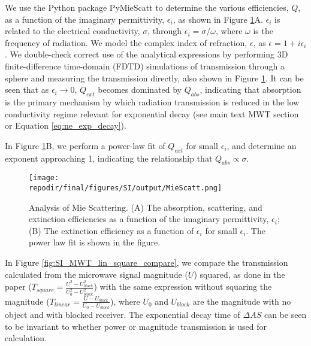 
We use the Python package PyMieScatt to determine the various efficiencies, $Q$, as a function of the imaginary permittivity, $\epsilon_i$, as shown in Figure \ref{fig:SI_Mie_Scattering}A. $\epsilon_i$ is related to the electrical conductivity, $\sigma$, through $\epsilon_i = \sigma/\omega$, where $\omega$ is the frequency of radiation. \cite{coltonComplexWaveNumber2021}  We model the complex index of refraction, $\epsilon$, as $\epsilon = 1 + i\epsilon_i$. We double-check correct use of the analytical expressions by performing 3D finite-difference time-domain (FDTD) simulations of transmission through a sphere and measuring the transmission directly, also shown in Figure \ref{fig:SI_Mie_Scattering}. It can be seen that as $\epsilon_i \rightarrow 0$, $Q_{ext}$ becomes dominated by $Q_{abs}$, indicating that absorption is the primary mechanism by which radiation transmission is reduced in the low conductivity regime relevant for exponential decay (see main text MWT section or Equation \ref{eq:ne_exp_decay}).

In Figure \ref{fig:SI_Mie_Scattering}B, we perform a power-law fit of $Q_{ext}$ for small $\epsilon_i$, and determine an exponent approaching 1, indicating the relationship that $Q_{abs} \propto \sigma$. 


\begin{figure}[H]
\centering
\texttt{[image: \\repodir/final/figures/SI/output/MieScatt.png]}
\caption{Analysis of Mie Scattering. (A) The absorption, scattering, and extinction efficiencies as a function of the imaginary permittivity, $\epsilon_i$; (B) The extinction efficiency as a function of $\epsilon_i$ for small $\epsilon_i$. The power law fit is shown in the figure.}
\label{fig:SI_Mie_Scattering}
\end{figure}


In Figure \ref{fig:SI_MWT_lin_square_compare}, we compare the transmission calculated from the microwave signal magnitude ($U$) squared, as done in the paper ($T_{square}  = \frac{U^2 - U_{block}^2}{U_0^2 - U_{block}^2}$) with the same expression without squaring the magnitude ($T_{linear}  = \frac{U - U_{block}}{U_0 - U_{block}}$), where $U_0$ and $U_{block}$ are the magnitude with no object and with blocked receiver. The exponential decay time of $\Delta AS$ can be seen to be invariant to whether power or magnitude transmission is used for calculation. 

